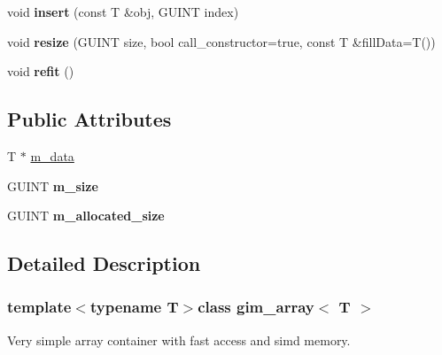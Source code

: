 \begin{DoxyCompactItemize}
\item 
\hypertarget{classgim__array_aa1855162e3317aead1e20dfe895dfe5c}{void {\bfseries insert} (const T \&obj, G\+U\+I\+N\+T index)}\label{classgim__array_aa1855162e3317aead1e20dfe895dfe5c}

\item 
\hypertarget{classgim__array_aa4a78ae4cec9771904e3b461c494431a}{void {\bfseries resize} (G\+U\+I\+N\+T size, bool call\+\_\+constructor=true, const T \&fill\+Data=T())}\label{classgim__array_aa4a78ae4cec9771904e3b461c494431a}

\item 
\hypertarget{classgim__array_adee8674335c3f49686fffe144cca6deb}{void {\bfseries refit} ()}\label{classgim__array_adee8674335c3f49686fffe144cca6deb}

\end{DoxyCompactItemize}

\subsection*{Public Attributes}
{\bf }\par
\begin{DoxyCompactItemize}
\item 
T $\ast$ \hyperlink{classgim__array_aafb886b0fb48bed8c878d8a82dc4099c}{m\+\_\+data}
\item 
\hypertarget{classgim__array_a2cf2f444d6ce2cf6262d20d1d3c49278}{G\+U\+I\+N\+T {\bfseries m\+\_\+size}}\label{classgim__array_a2cf2f444d6ce2cf6262d20d1d3c49278}

\item 
\hypertarget{classgim__array_abd86b4cd0d2dcc03d13505f02e950752}{G\+U\+I\+N\+T {\bfseries m\+\_\+allocated\+\_\+size}}\label{classgim__array_abd86b4cd0d2dcc03d13505f02e950752}

\end{DoxyCompactItemize}



\subsection{Detailed Description}
\subsubsection*{template$<$typename T$>$class gim\+\_\+array$<$ T $>$}

Very simple array container with fast access and simd memory. 

